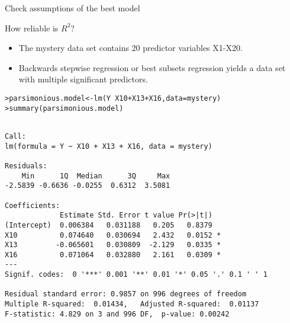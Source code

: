 \documentclass{beamer}\usepackage[]{graphicx}\usepackage[]{color}
\makeatletter
\newcommand{\hlopt}[1]{\textcolor[rgb]{1,0.894,0.769}{#1}}%
\newcommand{\hlstd}[1]{\textcolor[rgb]{1,0.894,0.769}{#1}}%
\newcommand{\hlkwb}[1]{\textcolor[rgb]{0.804,0.776,0.451}{#1}}%
\newcommand{\hlkwc}[1]{\textcolor[rgb]{0.78,0.941,0.545}{#1}}%
\newcommand{\hlkwd}[1]{\textcolor[rgb]{1,0.78,0.769}{#1}}%
\newenvironment{kframe}{%
 \def\at@end@of@kframe{}%
 \ifinner\ifhmode%
  \def\at@end@of@kframe{\end{minipage}}%
  \begin{minipage}{\columnwidth}%
 \fi\fi%
 \def\FrameCommand##1{\hskip\@totalleftmargin \hskip-\fboxsep
 \colorbox{shadecolor}{##1}\hskip-\fboxsep
     \hskip-\linewidth \hskip-\@totalleftmargin \hskip\columnwidth}%
 \MakeFramed {\advance\hsize-\width
   \@totalleftmargin\z@ \linewidth\hsize
   \@setminipage}}%
 {\par\unskip\endMakeFramed%
 \at@end@of@kframe}
\newenvironment{knitrout}{}{} %
\makeatother
\begin{document}
\begin{darkframes}
\begin{frame}[fragile]{Check assumptions of the best model}
\begin{knitrout}
\end{knitrout}

    \end{frame}

    \begin{frame}
    \end{frame}

    \begin{frame}{How reliable is $R^2$?}
      \begin{itemize}[<+->]
        \item The mystery data set contains 20 predictor variables X1-X20.
        \item Backwards stepwise regression or best subsets regression yields a data set with multiple significant predictors.
      \end{itemize}
    \end{frame}

    \begin{frame}[fragile]
      \fontvsm
\begin{knitrout}
\begin{kframe}
\begin{alltt}
\hlstd{> }\hlstd{parsimonious.model} \hlkwb{<-} \hlkwd{lm}\hlstd{(Y} \hlopt{~} \hlstd{X10} \hlopt{+} \hlstd{X13} \hlopt{+} \hlstd{X16,} \hlkwc{data}\hlstd{=mystery)}
\hlstd{> }\hlkwd{summary}\hlstd{(parsimonious.model)}
\end{alltt}
\begin{verbatim}

Call:
lm(formula = Y ~ X10 + X13 + X16, data = mystery)

Residuals:
    Min      1Q  Median      3Q     Max 
-2.5839 -0.6636 -0.0255  0.6312  3.5081 

Coefficients:
             Estimate Std. Error t value Pr(>|t|)  
(Intercept)  0.006384   0.031188   0.205   0.8379  
X10          0.074640   0.030694   2.432   0.0152 *
X13         -0.065601   0.030809  -2.129   0.0335 *
X16          0.071064   0.032880   2.161   0.0309 *
---
Signif. codes:  0 '***' 0.001 '**' 0.01 '*' 0.05 '.' 0.1 ' ' 1

Residual standard error: 0.9857 on 996 degrees of freedom
Multiple R-squared:  0.01434,	Adjusted R-squared:  0.01137 
F-statistic: 4.829 on 3 and 996 DF,  p-value: 0.00242
\end{verbatim}
\end{kframe}
\end{knitrout}
    \end{frame}


\end{darkframes}
\end{document}
